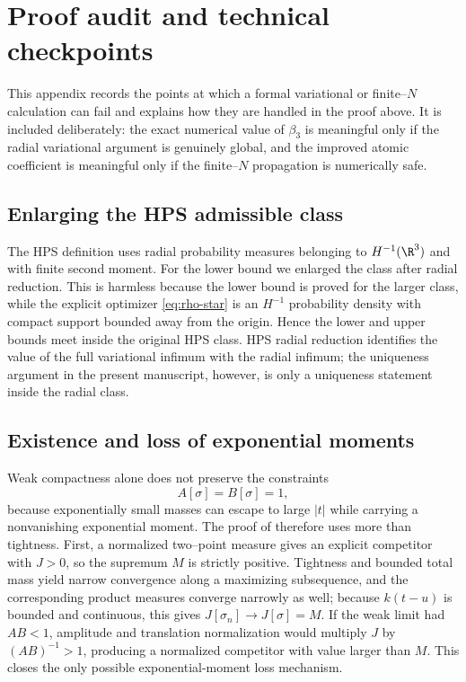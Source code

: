 \section{Proof audit and technical checkpoints}

This appendix records the points at which a formal variational or finite--$N$ calculation can fail and explains how they are handled in the proof above.  It is included deliberately: the exact numerical value of $\beta_3$ is meaningful only if the radial variational argument is genuinely global, and the improved atomic coefficient is meaningful only if the finite--$N$ propagation is numerically safe.

\subsection{Enlarging the HPS admissible class}

The HPS definition uses radial probability measures belonging to $H^{-1}(\R^3)$ and with finite second moment.  For the lower bound we enlarged the class after radial reduction.  This is harmless because the lower bound is proved for the larger class, while the explicit optimizer \eqref{eq:rho-star} is an $H^{-1}$ probability density with compact support bounded away from the origin.  Hence the lower and upper bounds meet inside the original HPS class.  HPS radial reduction identifies the value of the full variational infimum with the radial infimum; the uniqueness argument in the present manuscript, however, is only a uniqueness statement inside the radial class.

\subsection{Existence and loss of exponential moments}

Weak compactness alone does not preserve the constraints
\[
 A[\sigma]=B[\sigma]=1,
\]
because exponentially small masses can escape to large $|t|$ while carrying a nonvanishing exponential moment.  The proof of  therefore uses more than tightness.  First, a normalized two--point measure gives an explicit competitor with $J>0$, so the supremum $M$ is strictly positive.  Tightness and bounded total mass yield narrow convergence along a maximizing subsequence, and the corresponding product measures converge narrowly as well; because $k(t-u)$ is bounded and continuous, this gives $J[\sigma_n]\to J[\sigma]=M$.  If the weak limit had $A B<1$, amplitude and translation normalization would multiply $J$ by $(AB)^{-1}>1$, producing a normalized competitor with value larger than $M$.  This closes the only possible exponential-moment loss mechanism.

